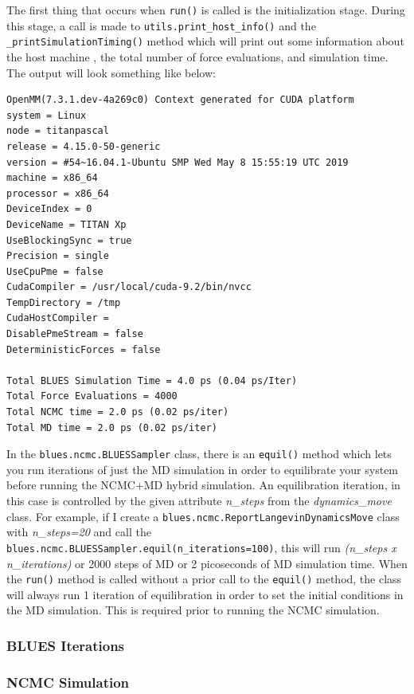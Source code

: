 The first thing that occurs when \texttt{run()} is called is the initialization stage.
During this stage, a call is made to \texttt{utils.print_host_info()} and the \texttt{_printSimulationTiming()} method which will print out some information about the host machine , the total number of force evaluations, and simulation time. 
The output will look something like below:

\begin{verbatim}
OpenMM(7.3.1.dev-4a269c0) Context generated for CUDA platform
system = Linux
node = titanpascal
release = 4.15.0-50-generic
version = #54~16.04.1-Ubuntu SMP Wed May 8 15:55:19 UTC 2019
machine = x86_64
processor = x86_64
DeviceIndex = 0
DeviceName = TITAN Xp
UseBlockingSync = true
Precision = single
UseCpuPme = false
CudaCompiler = /usr/local/cuda-9.2/bin/nvcc
TempDirectory = /tmp
CudaHostCompiler =
DisablePmeStream = false
DeterministicForces = false

Total BLUES Simulation Time = 4.0 ps (0.04 ps/Iter)
Total Force Evaluations = 4000
Total NCMC time = 2.0 ps (0.02 ps/iter)
Total MD time = 2.0 ps (0.02 ps/iter)
\end{verbatim}

In the \texttt{blues.ncmc.BLUESSampler} class, there is an \texttt{equil()} method which lets you run iterations of just the MD simulation in order to equilibrate your system before running the NCMC+MD hybrid simulation. 
An equilibration iteration, in this case is controlled by the given attribute \emph{n\_steps} from the \emph{dynamics\_move} class.
For example, if I create a \texttt{blues.ncmc.ReportLangevinDynamicsMove} class with \emph{n\_steps=20} and call the \texttt{blues.ncmc.BLUESSampler.equil(n_iterations=100)}, this will run \emph{(n\_steps x n\_iterations)} or 2000 steps of MD or 2 picoseconds of MD simulation time.
When the \texttt{run()} method is called without a prior call to the \texttt{equil()} method, the class will always run 1 iteration of equilibration in order to set the initial conditions in the MD simulation.
This is required prior to running the NCMC simulation.

\hypertarget{blues-iterations}{%
\subsubsection{BLUES Iterations}\label{blues-iterations}}

\subsubsection{NCMC Simulation}

